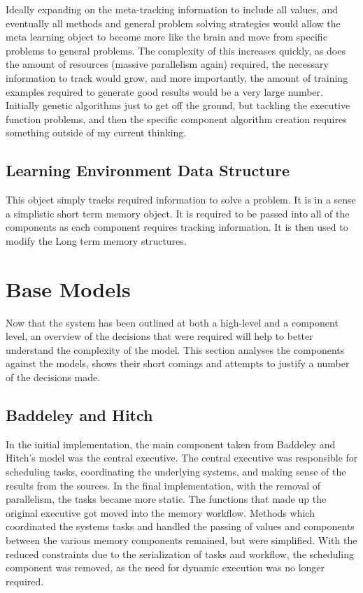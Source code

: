 Ideally expanding on the meta-tracking information to include all values, and
eventually all methods and general problem solving strategies would allow the
meta learning object to become more like the brain and move from specific
problems to general problems.  The complexity of this increases quickly, as does
the amount of resources (massive parallelism again) required, the necessary
information to track would grow, and more importantly, the amount of training
examples required to generate good results would be a very large number.
Initially genetic algorithms just to get off the ground, but tackling the
executive function problems, and then the specific component algorithm creation
requires something outside of my current thinking.

\subsection{Learning Environment Data Structure}  This object simply tracks
required information to solve a problem.  It is in a sense a simplistic short
term memory object.  It is required to be passed into all of the components as
each component requires tracking information.  It is then used to modify the
Long term memory structures.

\section{Base Models}

Now that the system has been outlined at both a high-level and a component
level, an overview of the decisions that were required will help to better
understand the complexity of the model. This section analyses the components
against the models, shows their short comings and attempts to justify a number
of the decisions made.

\subsection{Baddeley and Hitch}

In the initial implementation, the main component taken from Baddeley and
Hitch's model was the central executive.  The central executive was responsible
for scheduling tasks, coordinating the underlying systems, and making sense of
the results from the sources.  In the final implementation, with the removal of
parallelism, the tasks became more static.  The functions that made up the
original executive got moved into the memory workflow.  Methods which
coordinated the systems tasks and handled the passing of values and components
between the various memory components remained, but were simplified.  With the
reduced constraints due to the serialization of tasks and workflow, the
scheduling component was removed, as the need for dynamic execution was no
longer required.


